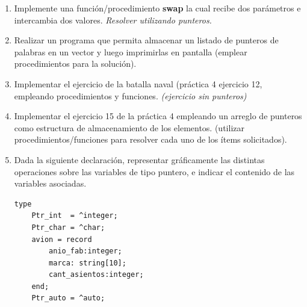 \documentclass[a4paper,10pt]{article}
\begin{document}
\begin{enumerate}
\item Implemente una funci\'on/procedimiento \textbf{swap} la cual recibe dos par\'ametros e intercambia dos valores. \emph{Resolver utilizando punteros.}

\item Realizar un programa que permita almacenar un listado de punteros de palabras en un vector y luego imprimirlas en pantalla (emplear procedimientos para la soluci\'on).

\item Implementar el ejercicio de la batalla naval (pr\'actica 4 ejercicio 12, empleando procedimientos y funciones. \emph{(ejercicio sin punteros)}

\item Implementar el ejercicio 15 de la pr\'actica 4 empleando un arreglo de punteros como estructura de almacenamiento de los elementos. (utilizar procedimientos/funciones para resolver cada uno de los \'items solicitados).

\item Dada la siguiente declaraci\'on, representar gr\'aficamente las distintas operaciones sobre las variables de tipo puntero, e indicar el contenido de las variables asociadas.
\begin{small}
\begin{verbatim}
type
    Ptr_int  = ^integer;
    Ptr_char = ^char;
    avion = record
        anio_fab:integer;
        marca: string[10];
        cant_asientos:integer;
    end;
    Ptr_auto = ^auto;


\end{verbatim}
\end{small}
\end{enumerate}
\end{document}
